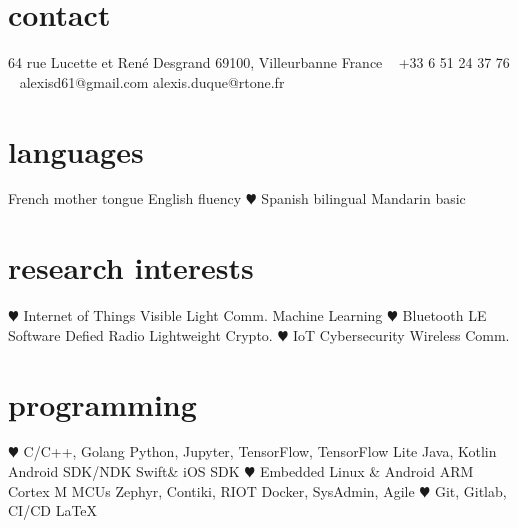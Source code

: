 \documentclass[]{cv-style}          %
\begin{document}
\lastupdated


\begin{aside}
%
\section{contact}
64 rue Lucette et René Desgrand
69100, Villeurbanne
France
~
+33 6 51 24 37 76
~
alexisd61@gmail.com
alexis.duque@rtone.fr
%
\section{languages}
French mother tongue
English fluency
{\color{red} $\varheartsuit$} Spanish bilingual
Mandarin basic
%
\section{research interests}
{\color{red} $\varheartsuit$} Internet of Things
Visible Light Comm.
Machine Learning
{\color{red} $\varheartsuit$} Bluetooth LE
Software Defied Radio
Lightweight Crypto.
{\color{red} $\varheartsuit$} IoT Cybersecurity
Wireless Comm.
%
\section{programming}
{\color{red} $\varheartsuit$} C/C++, Golang
Python, Jupyter, TensorFlow, TensorFlow Lite
Java, Kotlin
Android SDK/NDK
Swift\& iOS SDK
{\color{red} $\varheartsuit$} Embedded Linux \& Android
ARM Cortex M MCUs
Zephyr, Contiki, RIOT
Docker, SysAdmin, Agile
{\color{red} $\varheartsuit$} Git, Gitlab, CI/CD
\LaTeX{}
%
\end{aside}




\end{document}
